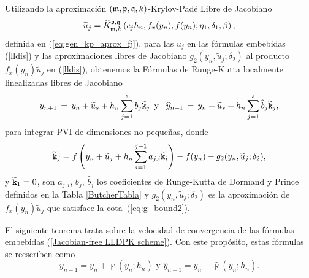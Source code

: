 Utilizando la aproximación $(\mathfrak{m} , \mathfrak{p} ,\mathfrak{q} , k)$-Krylov-Padé Libre de Jacobiano
\begin{equation}
\widetilde{u}_j=\widehat{K}_{\mathfrak{m},k}^{\mathfrak{p},\mathfrak{q}}\left(c_j h_n, f_x(y_n) , f(y_n); \eta_1, \delta_1, \beta \right) \label{eq:approx_u_j},
\end{equation}
definida en (\ref{eq:gen_kp_aprox_fj}), para las $u_j$ en las fórmulas embebidas (\ref{lldis}) y las aproximaciones libres de Jacobiano $g_2(y_n,\widetilde{u}_j;\delta_2)$ al producto  $f_x(y_n)\widetilde{u}_j$ en (\ref{lldis}), obtenemos la Fórmulas de Runge-Kutta localmente linealizadas libres de Jacobiano
\begin{equation}
	y_{n+1}\,=\,y_n+\widetilde{u}_s+h_n \sum_{j=1}^{s}b_j \widetilde{\mathtt{k}}_j \,\,\, \text{y} \,\,\, \
	\widehat{y}_{n+1}\,=\, y_n+\widetilde{u}_s+h_n \sum_{j=1}^{s}\widehat{b}_j \widetilde{\mathtt{k}}_j, \label{Jacobian-free LLDPK scheme}
	\end{equation}
para integrar PVI de dimensiones no pequeñas, donde
\begin{equation*}
	\widetilde{\mathtt{k}}_j = f\left( y_n+\widetilde{u}_j+h_n \sum_{i=1}^{j-1}a_{j,i}\widetilde{\mathtt{k}}_i \right) - f( y_n) - g_2(y_n,\widetilde{u}_j;\delta_2),
\end{equation*}
y $\widetilde{\mathtt{k}}_1=0$, son $a_{j,i}$, $b_j$, $\widehat{b}_j$ los coeficientes de Runge-Kutta de  Dormand y Prince definidos en la Tabla \ref{ButcherTabla} y  $g_2(y_n,\widetilde{u}_j;\delta_2)$ es la aproximación de $f_x(y_n)\widetilde{u}_j$ que satisface la cota~(\ref{eq:g_bound2}).

El siguiente teorema trata sobre la velocidad de convergencia de las fórmulas embebidas (\ref{Jacobian-free LLDPK scheme}). Con este propósito, estas fórmulas se reescriben como
\begin{equation*}
    y_{n+1}=y_{n}+\digamma (y_{n};h_{n})\text{ \ \ \ \ y \ \ \ \ }\widehat{y}_{n+1}=y_{n}+\widehat{\digamma }(y_{n};h_{n}).
\end{equation*}


